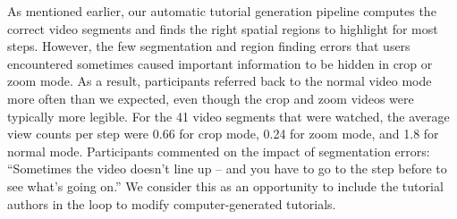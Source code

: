 As mentioned earlier, our automatic tutorial generation pipeline computes the correct video segments and finds the right spatial regions to highlight for most steps. However, the few segmentation and region finding errors that users encountered sometimes caused important information to be hidden in crop or zoom mode. As a result, participants referred back to the normal video mode more often than we expected, even though the crop and zoom videos were typically more legible. For the 41 video segments that were watched, the average view counts per step were 0.66 for crop mode, 0.24 for zoom mode, and 1.8 for normal mode. Participants commented on the impact of segmentation errors: “Sometimes the video doesn't line up – and you have to go to the step before to see what's going on.” We consider this as an opportunity to include the tutorial authors in the loop to modify computer-generated tutorials.
